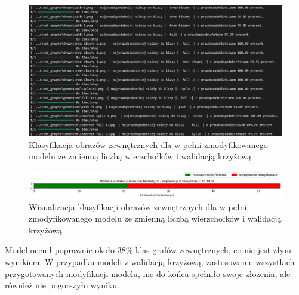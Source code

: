 \begin{figure}[ht]
	\centering
	\includegraphics[width=14cm]{resources/tests/images/v4/multiple_edges_crossvalid_txt.png}
	\caption{Klasyfikacja obrazów zewnętrznych dla w pełni zmodyfikowanego modelu ze zmienną liczbą wierzchołków i walidacją krzyżową}
	\label{Fig:tests-csvar-2b}
\end{figure}
\FloatBarrier

\begin{figure}[ht]
	\centering
	\includegraphics[width=14cm]{resources/tests/images/v4/multiple_edges_crossvalid_bar.png}
	\caption{Wizualizacja klasyfikacji obrazów zewnętrznych dla w pełni zmodyfikowanego modelu ze zmienną liczbą wierzchołków i walidacją krzyżową}
	\label{Fig:tests-csvar-2c}
\end{figure}
\FloatBarrier

Model ocenił poprawnie około 38\% klas grafów zewnętrznych, co nie jest złym wynikiem.
W przypadku modeli z walidacją krzyżową, zastosowanie wszystkich przygotowanych modyfikacji modelu,
nie do końca spełniło swoje złożenia, ale również nie pogorszyło wyniku.